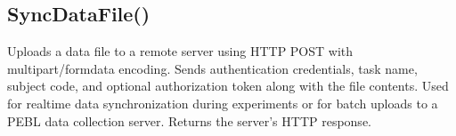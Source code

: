 \documentclass[letterpaper,10pt,english]{sphinxmanual}
\begin{document}
\ignorespaces 

\subsection{SyncDataFile()}
\label{\detokenize{reference/utility:syncdatafile}}\label{\detokenize{reference/utility:index-55}}
\sphinxAtStartPar
{}

\sphinxAtStartPar
{}

\sphinxAtStartPar
Uploads a data file to a remote server using HTTP POST with multipart/form\sphinxhyphen{}data encoding. Sends authentication credentials, task name, subject code, and optional authorization token along with the file contents. Used for real\sphinxhyphen{}time data synchronization during experiments or for batch uploads to a PEBL data collection server. Returns the server’s HTTP response.

\sphinxAtStartPar
{}

\begin{sphinxVerbatim}[commandchars=\\\{\}]
\end{sphinxVerbatim}

\sphinxAtStartPar
{}
\end{document}
